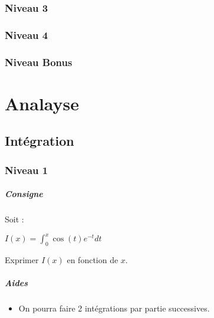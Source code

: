 \documentclass[a4paper]{report}
\begin{document}
			\subsection{Niveau 3}
			
			\subsection{Niveau 4}
			
			\subsection{Niveau Bonus}
	
	\chapter{Analayse}
		\section{Intégration}
			\subsection{Niveau 1}
				\begin{tcolorbox}[colback=white,colframe=black,title=Exercice - Intégration\underline{s} par partie]
					\paragraph{Consigne}
						Soit :
						\begin{center}
							$I(x) = \int_{0}^{x} \cos (t) e^{-t} dt$
						\end{center}
						Exprimer $I(x)$ en fonction de $x$.
						
					\tcblower					
					
					\paragraph{Aides}
						\begin{itemize}
							\item On pourra faire 2 intégrations par partie successives.					
						\end{itemize}	
				\end{tcolorbox}	
		
\end{document}
